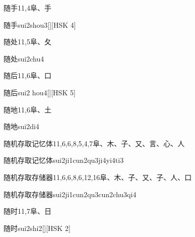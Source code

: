 \begin{entry}{随手}{11,4}{⾩、⼿}
  \begin{phonetics}{随手}{sui2shou3}[][HSK 4]
  \end{phonetics}
\end{entry}

\begin{entry}{随处}{11,5}{⾩、⼡}
  \begin{phonetics}{随处}{sui2chu4}
  \end{phonetics}
\end{entry}

\begin{entry}{随后}{11,6}{⾩、⼝}
  \begin{phonetics}{随后}{sui2 hou4}[][HSK 5]
  \end{phonetics}
\end{entry}

\begin{entry}{随地}{11,6}{⾩、⼟}
  \begin{phonetics}{随地}{sui2di4}
  \end{phonetics}
\end{entry}

\begin{entry}{随机存取记忆体}{11,6,6,8,5,4,7}{⾩、⽊、⼦、⼜、⾔、⼼、⼈}
  \begin{phonetics}{随机存取记忆体}{sui2ji1cun2qu3ji4yi4ti3}
  \end{phonetics}
\end{entry}

\begin{entry}{随机存取存储器}{11,6,6,8,6,12,16}{⾩、⽊、⼦、⼜、⼦、⼈、⼝}
  \begin{phonetics}{随机存取存储器}{sui2ji1cun2qu3cun2chu3qi4}
  \end{phonetics}
\end{entry}

\begin{entry}{随时}{11,7}{⾩、⽇}
  \begin{phonetics}{随时}{sui2shi2}[][HSK 2]
  \end{phonetics}
\end{entry}

